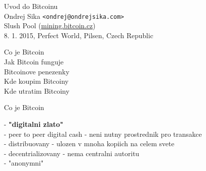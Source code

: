 \documentclass{beamer}
\begin{document}
\begin{frame}

    {\LARGE Uvod do Bitcoinu}\\
    \vspace{7mm}
    {\Large Ondrej Sika \lstinline|<ondrej@ondrejsika.com>|}\\
    \vspace{7mm}
    {\large Slush Pool (\url{mining.bitcoin.cz})}\\
    \vspace{7mm}
    8. 1. 2015, Perfect World, Pilsen, Czech Republic\\

\end{frame}

\begin{frame}

    {\LARGE Co je Bitcoin}\\
    \vspace{5mm}
    {\LARGE Jak Bitcoin funguje}\\
    \vspace{5mm}
    {\LARGE Bitcoinove penezenky}\\
    \vspace{5mm}
    {\LARGE Kde koupim Bitcoiny}\\
    \vspace{5mm}
    {\LARGE Kde utratim Bitcoiny}\\

\end{frame}

\begin{frame}

    {\LARGE Co je Bitcoin}\\

    \vspace{5mm}

    - {\bf "digitalni zlato"}\\
    - peer to peer digital cash - neni nutny prostrednik pro transakce\\
    - distribuovany - ulozen v mnoha kopiich na celem svete\\
    - decentrializovany - nema centralni autoritu\\
    - "anonymni"\\

\end{frame}
\end{document}
